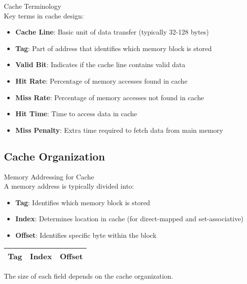 \begin{definition}{Cache Terminology}\\
Key terms in cache design:
\begin{itemize}
    \item \textbf{Cache Line}: Basic unit of data transfer (typically 32-128 bytes)
    \item \textbf{Tag}: Part of address that identifies which memory block is stored
    \item \textbf{Valid Bit}: Indicates if the cache line contains valid data
    \item \textbf{Hit Rate}: Percentage of memory accesses found in cache
    \item \textbf{Miss Rate}: Percentage of memory accesses not found in cache
    \item \textbf{Hit Time}: Time to access data in cache
    \item \textbf{Miss Penalty}: Extra time required to fetch data from main memory
\end{itemize}
\end{definition}

\subsection{Cache Organization}

\begin{concept}{Memory Addressing for Cache}\\
A memory address is typically divided into:
\begin{itemize}
    \item \textbf{Tag}: Identifies which memory block is stored
    \item \textbf{Index}: Determines location in cache (for direct-mapped and set-associative)
    \item \textbf{Offset}: Identifies specific byte within the block
\end{itemize}
\begin{center}
\begin{tabular}{|c|c|c|}
\hline
Tag & Index & Offset \\
\hline
\end{tabular}
\end{center}
The size of each field depends on the cache organization.
\end{concept}


